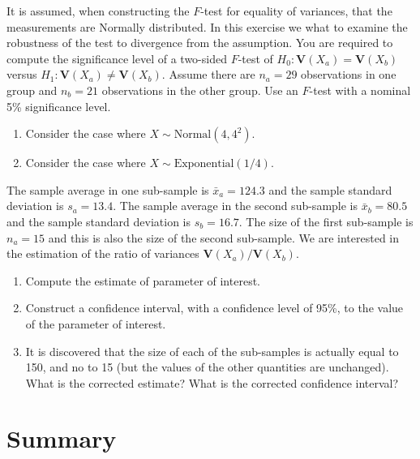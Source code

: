 \documentclass[
]{krantz}
\newcommand{\Var}{\mathbf{V}}
\theoremstyle{definition}
\theoremstyle{definition}
\theoremstyle{definition}
\theoremstyle{remark}
\let\BeginKnitrBlock\begin \let\EndKnitrBlock\end
\begin{document}
\BeginKnitrBlock{exercise}
\protect\hypertarget{exr:unnamed-chunk-206}{}{\label{exr:unnamed-chunk-206} }It is assumed, when constructing the \(F\)-test for
equality of variances, that the measurements are Normally distributed.
In this exercise we what to examine the robustness of the test to
divergence from the assumption. You are required to compute the
significance level of a two-sided \(F\)-test of \(H_0:\Var(X_a)=\Var(X_b)\)
versus \(H_1: \Var(X_a)\not =\Var(X_b)\). Assume there are \(n_a=29\)
observations in one group and \(n_b = 21\) observations in the other
group. Use an \(F\)-test with a nominal 5\% significance level.

\begin{enumerate}
\def\labelenumi{\arabic{enumi}.}
\item
  Consider the case where \(X \sim \mathrm{Normal}(4,4^2)\).
\item
  Consider the case where \(X \sim \mathrm{Exponential}(1/4)\).
\end{enumerate}
\EndKnitrBlock{exercise}

\BeginKnitrBlock{exercise}
\protect\hypertarget{exr:unnamed-chunk-207}{}{\label{exr:unnamed-chunk-207} }The sample average in one sub-sample is
\(\bar x_a = 124.3\) and the sample standard deviation is \(s_a = 13.4\).
The sample average in the second sub-sample is \(\bar x_b = 80.5\) and the
sample standard deviation is \(s_b = 16.7\). The size of the first
sub-sample is \(n_a=15\) and this is also the size of the second
sub-sample. We are interested in the estimation of the ratio of
variances \(\Var(X_a)/\Var(X_b)\).

\begin{enumerate}
\def\labelenumi{\arabic{enumi}.}
\item
  Compute the estimate of parameter of interest.
\item
  Construct a confidence interval, with a confidence level of 95\%, to
  the value of the parameter of interest.
\item
  It is discovered that the size of each of the sub-samples is
  actually equal to 150, and no to 15 (but the values of the other
  quantities are unchanged). What is the corrected estimate? What is
  the corrected confidence interval?
\end{enumerate}
\EndKnitrBlock{exercise}

\hypertarget{summary-11}{%
\section{Summary}\label{summary-11}}
\end{document}
